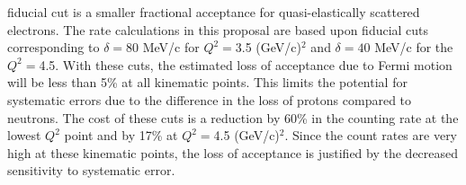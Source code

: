 \documentclass[12pt,letterpaper,oneside]{article}
\begin{document}
fiducial cut is a smaller fractional acceptance for quasi-elastically
scattered electrons.
The rate calculations in this proposal are based upon fiducial cuts
corresponding to $\delta=80$ MeV/c for $Q^2=$3.5 (GeV/c)$^2$ and 
$\delta=40$ MeV/c for the  $Q^2=$4.5.
With these cuts, the
estimated loss of acceptance due to Fermi motion will be less than 5\%
at all kinematic points.  This limits the potential for systematic errors
due to the difference in the loss of protons compared to neutrons.
The cost of these cuts is a reduction by 60\% in the counting rate at 
the lowest $Q^2$ point and by 17\% at  $Q^2=$4.5 (GeV/c)$^2$.
Since the count rates are very high at these kinematic points, the
loss of acceptance is justified by the decreased sensitivity to
systematic error.


\end{document}
